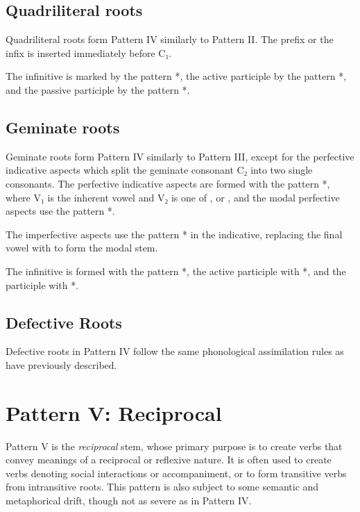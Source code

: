 \documentclass[grammar]{subfiles}
\begin{document}
\subsection{Quadriliteral roots}
\label{ssec:vm_iv_quadriliteral_roots}

Quadriliteral roots form Pattern IV similarly to Pattern II. The prefix
 or the infix  is inserted immediately before C₁. 

The infinitive is marked by the pattern *, the active
participle by the pattern *, and the passive participle by the
pattern *.  


\subsection{Geminate roots}
\label{ssec:vm_iv_geminate_roots}

Geminate roots form Pattern IV similarly to Pattern III, except for the
perfective indicative aspects which split the geminate consonant C₂ into two
single consonants.   The perfective indicative aspects are formed with the
pattern *, where V₁ is the inherent vowel and V₂ is one of
,  or , and the modal perfective aspects use the pattern
*.  

The imperfective aspects use the pattern * in the indicative,
replacing the final vowel with  to form the modal stem. 

The infinitive is formed with the pattern *, the active participle
with *, and the participle with *.  



\subsection{Defective Roots}
\label{ssec:vm_iv_defective_roots}

Defective roots in Pattern IV follow the same phonological assimilation rules
as have previously described. 


\section{Pattern V: Reciprocal}
\label{sec:vm_pattern_v}

Pattern V is the \emph{reciprocal} stem, whose primary purpose is to create verbs that
convey meanings of a reciprocal or reflexive nature.  It is often used to
create verbs denoting social interactions or accompaniment, or to form
transitive verbs from intransitive roots.  This pattern is also subject to some
semantic and metaphorical drift, though not as severe as in Pattern IV.
\end{document}
